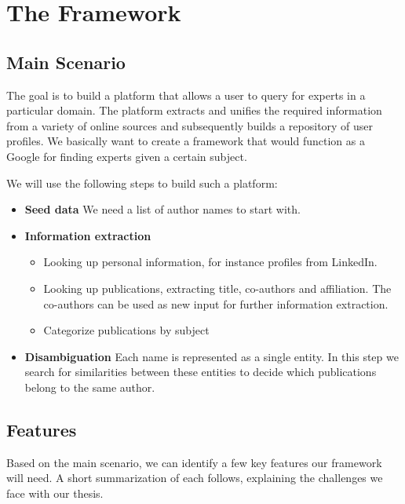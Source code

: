 \chapter{The Framework}
\label{framework}

\section{Main Scenario}

The goal is to build a platform that allows a user to query for experts in a particular domain. The platform extracts and unifies the required information from a variety of online sources and subsequently builds a repository of user profiles. We basically want to create a framework that would function as a Google for finding experts given a certain subject.

We will use the following steps to build such a platform:


\begin{itemize}
	\item \textbf{Seed data} We need a list of author names to start with.
	\item \textbf{Information extraction}
		\begin{itemize}
			\item Looking up personal information, for instance profiles from LinkedIn.
			\item Looking up publications, extracting title, co-authors and affiliation. The co-authors can be used as new input for further information extraction.
			\item Categorize publications by subject
		\end{itemize}
	\item \textbf{Disambiguation} Each name is represented as a single entity. In this step we search for similarities between these entities to decide which publications belong to the same author.
\end{itemize}

\section{Features}

Based on the main scenario, we can identify a few key features our framework will need. A short summarization of each follows, explaining the challenges we face with our thesis.

